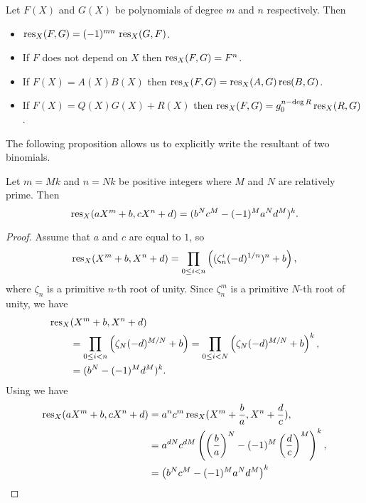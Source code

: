 \begin{proposition} \label{Resultant:Properties:Prop}
Let $F(X)$ and $G(X)$ be polynomials of degree $m$ and $n$
respectively.  Then
\begin{itemize}
\item $\mathop{\rm res}\nolimits_X (F, G) = (-1)^{mn} \, \mathop{\rm res}\nolimits_X(G, F)$.
\item If $F$ does not depend on $X$ then $\mathop{\rm res}\nolimits_X(F, G) = F^n$.
\item If $F(X) = A(X) B(X)$ then $\mathop{\rm res}\nolimits_X(F, G) = 
\mathop{\rm res}\nolimits_X(A, G) \mathop{\rm res}\nolimits(B, G)$.
\item If $F(X) = Q(X) G(X) + R(X)$ then
$\mathop{\rm res}\nolimits_X(F, G) = g_0^{n-\deg R} \mathop{\rm res}\nolimits_X(R, G)$.
\end{itemize}
\end{proposition}

The following proposition allows us to explicitly write the resultant of
two binomials.
\begin{proposition} \label{Binomial:Result:Prop}
Let $m = M k$ and $n = N k$ be positive integers where $M$ and $N$ are
relatively prime.  Then 
\[
\mathop{\rm res}\nolimits_X(aX^m + b, cX^n + d) = (b^N c^M - (-1)^M a^N d^M)^k.
\]
\end{proposition}

\begin{proof}
Assume that $a$ and $c$ are equal to $1$, so 
\[
\mathop{\rm res}\nolimits_X(X^m + b, X^n +d) 
   = \prod_{0 \le i < n} \left((\zeta_n^i (-d)^{1/n})^n + b\right),
\]
where $\zeta_n$ is a primitive $n$-th root of unity.
Since $\zeta_n^m$ is a primitive $N$-th root of unity, we have
\[
\begin{aligned}
\mathop{\rm res}\nolimits_X&(X^m + b, X^n +d) \\
 & = \prod_{0 \le i < n} \left(\zeta_N (-d)^{M/N} + b\right)
   = \prod_{0 \le i < N} \left(\zeta_N (-d)^{M/N} + b\right)^k, \\
 & = (b^N - (-1)^M d^M)^k.
\end{aligned}
\]
Using  we have
\[
\begin{aligned}
\mathop{\rm res}\nolimits_X(aX^m + b, cX^n +d) 
  & = a^n c^m \mathop{\rm res}\nolimits_X (X^m + \frac{b}{a}, X^n + \frac{d}{c}), \\
  & = a^{dN} c^{d M} 
     \left(\left(\frac{b}{a}\right)^N 
         - (-1)^M \left(\frac{d}{c}\right)^M\right)^k, \\
  & = \left(b^N c^M - (-1)^M a^N d^M\right)^k
\end{aligned}
\]
\end{proof}

